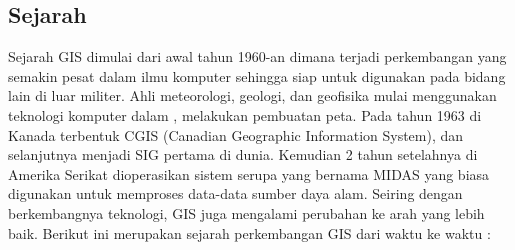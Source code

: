 \subsection{Sejarah}
Sejarah GIS dimulai dari awal tahun 1960-an dimana terjadi perkembangan yang semakin pesat dalam ilmu komputer sehingga siap untuk digunakan pada bidang lain di luar militer. Ahli meteorologi, geologi, dan geofisika mulai menggunakan teknologi komputer dalam , melakukan pembuatan peta.\hfill\break
Pada tahun 1963 di Kanada terbentuk CGIS (Canadian Geographic Information System), dan selanjutnya menjadi SIG pertama di dunia. Kemudian 2 tahun setelahnya di Amerika Serikat dioperasikan sistem serupa yang bernama MIDAS yang biasa digunakan untuk memproses data-data sumber daya alam.\hfill\break
Seiring dengan berkembangnya teknologi, GIS juga mengalami perubahan ke arah yang lebih baik. \hfill\break
Berikut ini merupakan sejarah perkembangan GIS dari waktu ke waktu :\hfill\break
